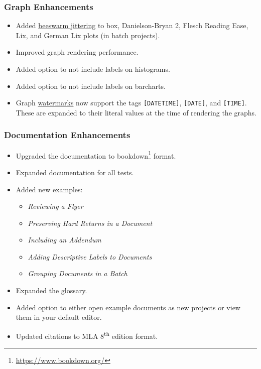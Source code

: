 \documentclass[
]{book}
\DeclareRobustCommand{\href}[2]{#2\footnote{\url{#1}}}
\providecommand{\tightlist}{%
  \setlength{\itemsep}{0pt}\setlength{\parskip}{0pt}}
\theoremstyle{definition}
\theoremstyle{definition}
\theoremstyle{definition}
\theoremstyle{definition}
\theoremstyle{remark}
\begin{document}
\hypertarget{graph-enhancements}{%
\subsubsection*{Graph Enhancements}\label{graph-enhancements}}

\begin{itemize}
\tightlist
\item
  Added \protect\hyperlink{stats-issues}{beeswarm jittering} to box, Danielson-Bryan 2, Flesch Reading Ease, Lix, and German Lix plots (in batch projects).
\item
  Improved graph rendering performance.
\item
  Added option to not include labels on histograms.
\item
  Added option to not include labels on barcharts.
\item
  Graph \protect\hyperlink{watermark-and-logo}{watermarks} now support the tags \texttt{{[}DATETIME{]}}, \texttt{{[}DATE{]}}, and \texttt{{[}TIME{]}}. These are expanded to their literal values at the time of rendering the graphs.
\end{itemize}

\hypertarget{documentation-enhancements}{%
\subsubsection*{Documentation Enhancements}\label{documentation-enhancements}}

\begin{itemize}
\tightlist
\item
  Upgraded the documentation to \href{https://www.bookdown.org/}{bookdown} format.
\item
  Expanded documentation for all tests.
\item
  Added new examples:

  \begin{itemize}
  \tightlist
  \item
    \emph{Reviewing a Flyer}
  \item
    \emph{Preserving Hard Returns in a Document}
  \item
    \emph{Including an Addendum}
  \item
    \emph{Adding Descriptive Labels to Documents}
  \item
    \emph{Grouping Documents in a Batch}
  \end{itemize}
\item
  Expanded the glossary.
\item
  Added option to either open example documents as new projects or view them in your default editor.
\item
  Updated citations to MLA 8\textsuperscript{th} edition format.
\end{itemize}
\end{document}
